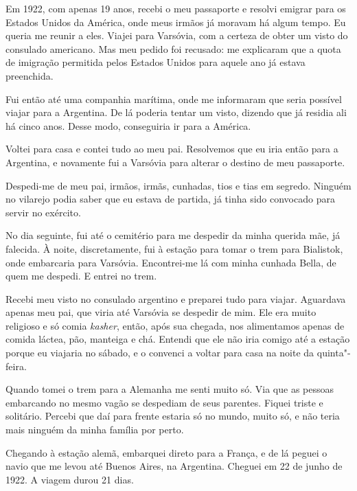 \begin{center}
\end{center}

Em 1922, com apenas 19 anos, recebi o meu passaporte e resolvi emigrar
para os Estados Unidos da América, onde meus irmãos já moravam
há algum tempo. Eu queria me reunir a eles. Viajei para Varsóvia, com
a certeza de obter um visto do consulado americano. Mas meu pedido 
foi recusado: me explicaram 
que a quota de imigração permitida pelos Estados Unidos para 
aquele ano já estava preenchida.

Fui então até uma companhia marítima, onde me informaram que seria possível
viajar para a Argentina. De lá poderia tentar um visto, dizendo que já residia ali há cinco anos. Desse modo, conseguiria ir para a América.

Voltei para casa e contei tudo ao meu pai. Resolvemos que eu
iria então para a Argentina, e novamente fui a Varsóvia para 
alterar o destino de meu passaporte.

Despedi-me de meu pai, irmãos, irmãs, cunhadas, tios e tias em
segredo. Ninguém no vilarejo podia saber que eu estava de partida, já tinha 
sido convocado para servir no exército.%

No dia seguinte, fui até o cemitério para me despedir da minha querida
mãe, já falecida. À noite, discretamente, fui à estação para
tomar o trem para Bialistok, onde embarcaria para Varsóvia. Encontrei-me lá 
com minha cunhada Bella, de quem me despedi. E entrei no trem.

Recebi meu visto no consulado argentino e preparei tudo para
viajar. Aguardava apenas meu pai, que viria até Varsóvia se despedir de mim.
Ele era muito religioso e só comia \textit{kasher}, então, após sua chegada, nos
alimentamos apenas de comida láctea, pão,
manteiga e chá. Entendi que ele não iria comigo até a estação porque
eu viajaria no sábado, e o convenci a voltar para casa na
noite da quinta"-feira. 

Quando tomei o trem para a Alemanha me senti muito só. Via que as pessoas embarcando no mesmo vagão se despediam de seus parentes. Fiquei triste e solitário. Percebi que daí para frente estaria
só no mundo, muito só, e não teria mais ninguém da minha família por perto.

Chegando à estação alemã, embarquei direto para a França, e de lá peguei o navio que me
levou até Buenos Aires, na Argentina. Cheguei em 22 de junho de 1922. A viagem durou 21 dias.

